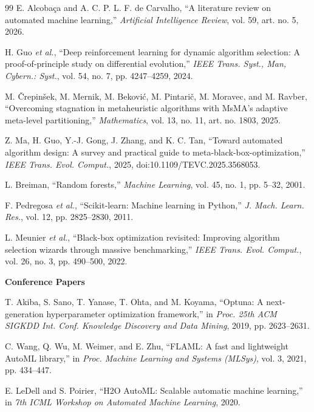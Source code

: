 \documentclass[11pt, a4paper]{article}
\begin{document}
\begin{thebibliography}{99}
 E. Alcoba\c{c}a and A. C. P. L. F. de Carvalho, ``A literature review on automated machine learning,'' \textit{Artificial Intelligence Review}, vol. 59, art. no. 5, 2026.

 H. Guo \textit{et al.}, ``Deep reinforcement learning for dynamic algorithm selection: A proof-of-principle study on differential evolution,'' \textit{IEEE Trans. Syst., Man, Cybern.: Syst.}, vol. 54, no. 7, pp. 4247--4259, 2024.

 M. \v{C}repin\v{s}ek, M. Mernik, M. Bekovi\'{c}, M. Pintari\v{c}, M. Moravec, and M. Ravber, ``Overcoming stagnation in metaheuristic algorithms with MsMA's adaptive meta-level partitioning,'' \textit{Mathematics}, vol. 13, no. 11, art. no. 1803, 2025.

 Z. Ma, H. Guo, Y.-J. Gong, J. Zhang, and K. C. Tan, ``Toward automated algorithm design: A survey and practical guide to meta-black-box-optimization,'' \textit{IEEE Trans. Evol. Comput.}, 2025, doi:10.1109/TEVC.2025.3568053.

 L. Breiman, ``Random forests,'' \textit{Machine Learning}, vol. 45, no. 1, pp. 5--32, 2001.

 F. Pedregosa \textit{et al.}, ``Scikit-learn: Machine learning in Python,'' \textit{J. Mach. Learn. Res.}, vol. 12, pp. 2825--2830, 2011.

 L. Meunier \textit{et al.}, ``Black-box optimization revisited: Improving algorithm selection wizards through massive benchmarking,'' \textit{IEEE Trans. Evol. Comput.}, vol. 26, no. 3, pp. 490--500, 2022.

\item[] \textbf{Conference Papers}

 T. Akiba, S. Sano, T. Yanase, T. Ohta, and M. Koyama, ``Optuna: A next-generation hyperparameter optimization framework,'' in \textit{Proc. 25th ACM SIGKDD Int. Conf. Knowledge Discovery and Data Mining}, 2019, pp. 2623--2631.

 C. Wang, Q. Wu, M. Weimer, and E. Zhu, ``FLAML: A fast and lightweight AutoML library,'' in \textit{Proc. Machine Learning and Systems (MLSys)}, vol. 3, 2021, pp. 434--447.

 E. LeDell and S. Poirier, ``H2O AutoML: Scalable automatic machine learning,'' in \textit{7th ICML Workshop on Automated Machine Learning}, 2020.


\end{thebibliography}
\end{document}
